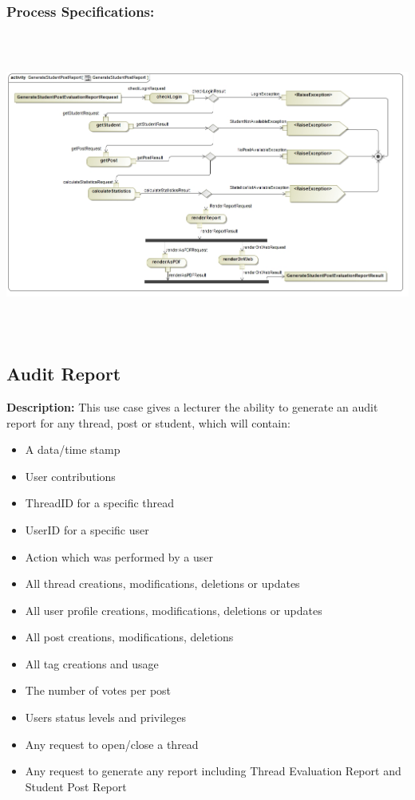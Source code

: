 \documentclass[a4paper,11pt]{article}
\begin{document}
\subsubsection{Process Specifications:} 
\includegraphics[width=15cm,height=10cm]{./Images/Report/StudentPost_PS}

\subsection{Audit Report}
\textbf{Description:}
This use case gives a lecturer the ability to generate an audit report for any thread, post or student, which will contain:
\begin{itemize}
\item A data/time stamp
\item User contributions
\item ThreadID for a specific thread
\item UserID for a specific user
\item Action which was performed by a user
\item All thread creations, modifications, deletions or updates
\item All user profile creations, modifications, deletions or updates
\item All post creations, modifications, deletions
\item All tag creations and usage
\item The number of votes per post
\item Users status levels and privileges
\item Any request to open/close a thread
\item Any request to generate any report including Thread Evaluation Report and Student Post Report
\end{itemize}
\end{document}
